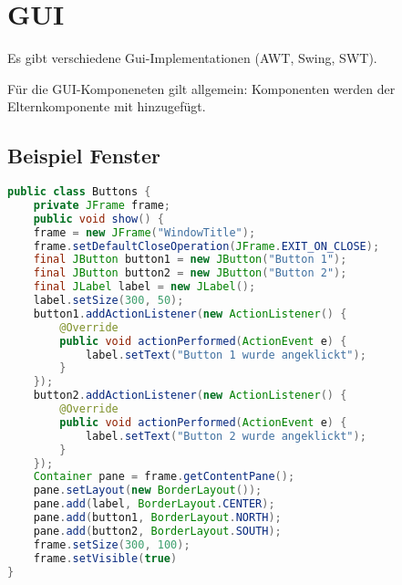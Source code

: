 \section{GUI}
Es gibt verschiedene Gui-Implementationen (AWT, Swing, SWT).

Für die GUI-Komponeneten gilt allgemein: Komponenten werden der Elternkomponente mit  hinzugefügt.

\subsection{Beispiel Fenster}
\begin{lstlisting}[language=Java]
public class Buttons {
	private JFrame frame;
	public void show() {
	frame = new JFrame("WindowTitle");
	frame.setDefaultCloseOperation(JFrame.EXIT_ON_CLOSE);
	final JButton button1 = new JButton("Button 1");
	final JButton button2 = new JButton("Button 2");
	final JLabel label = new JLabel();
	label.setSize(300, 50);
	button1.addActionListener(new ActionListener() {
		@Override
		public void actionPerformed(ActionEvent e) {
			label.setText("Button 1 wurde angeklickt");
		}
	});
	button2.addActionListener(new ActionListener() {
		@Override
		public void actionPerformed(ActionEvent e) {
			label.setText("Button 2 wurde angeklickt");
		}
	});
	Container pane = frame.getContentPane();
	pane.setLayout(new BorderLayout());
	pane.add(label, BorderLayout.CENTER);
	pane.add(button1, BorderLayout.NORTH);
	pane.add(button2, BorderLayout.SOUTH);
	frame.setSize(300, 100);
	frame.setVisible(true)
}
\end{lstlisting}

